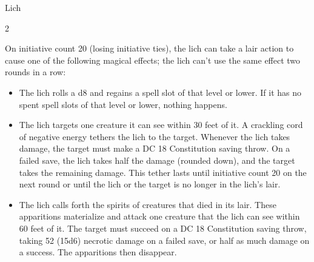 \documentclass[10pt,a4paper,twoside,bg=print,twocolumn,openany,nodeprecatedcode]{dndbook}
\begin{document}
\begin{DndMonster}[float*=b,width=\textwidth + 8pt]{Lich}
\begin{multicols}{2}
\begin{DndMonsterLegendaryActions}
\end{DndMonsterLegendaryActions}
On initiative count 20 (losing initiative ties), the lich can take a lair action to cause one of the following magical effects; the lich can't use the same effect two rounds in a row:


\begin{itemize}
\item The lich rolls a d8 and regains a spell slot of that level or lower. If it has no spent spell slots of that level or lower, nothing happens.
\item The lich targets one creature it can see within 30 feet of it. A crackling cord of negative energy tethers the lich to the target. Whenever the lich takes damage, the target must make a DC 18 Constitution saving throw. On a failed save, the lich takes half the damage (rounded down), and the target takes the remaining damage. This tether lasts until initiative count 20 on the next round or until the lich or the target is no longer in the lich's lair.
\item The lich calls forth the spirits of creatures that died in its lair. These apparitions materialize and attack one creature that the lich can see within 60 feet of it. The target must succeed on a DC 18 Constitution saving throw, taking 52 (15d6) necrotic damage on a failed save, or half as much damage on a success. The apparitions then disappear.
\end{itemize}

\end{multicols}
\end{DndMonster}
\end{document}

